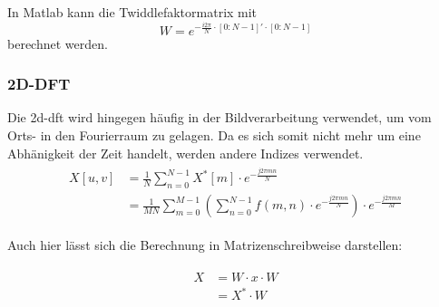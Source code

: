In Matlab kann die Twiddlefaktormatrix mit
\begin{equation}\label{eq:matlab_dft_faktoren}
 W = e^{-\frac{i 2 \pi}{N}\cdot[0:N-1]'\cdot[0:N-1]}
\end{equation}
berechnet werden.


\subsubsection{2D-DFT}
Die \gls{2d-dft} wird hingegen häufig in der Bildverarbeitung verwendet, um vom Orts- in den Fourierraum zu gelagen. Da es sich somit nicht mehr um eine Abhänigkeit 
der Zeit handelt, werden andere Indizes verwendet.
\begin{align}
\begin{split}
X[u,v] 	&= \frac{1}{N} \sum^{N-1}_{n=0} X^* \left[ m \right] \cdot e^{-\frac{j 2 \pi m n}{N}}\\
	&= \frac{1}{MN} \sum^{M-1}_{m=0} \left( \sum^{N-1}_{n=0} f(m,n) \cdot e^{-\frac{j 2 \pi m n}{N}} \right) \cdot e^{-\frac{j 2 \pi m n}{M}}
\end{split}
\end{align}

Auch hier lässt sich die Berechnung in Matrizenschreibweise darstellen:

\begin{align}
\begin{split}
 X &= W \cdot x \cdot W \\
                    &= X^* \cdot W
\end{split}
\end{align}


